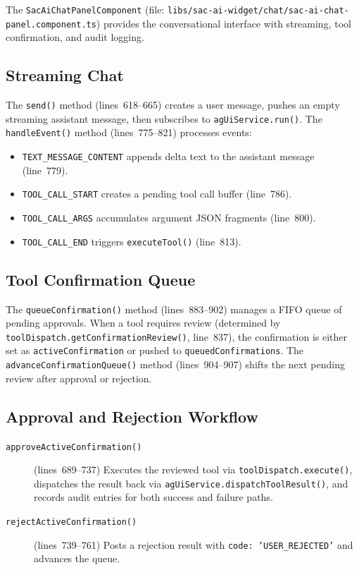 \documentclass[11pt]{article}
\begin{document}
The \texttt{SacAiChatPanelComponent} (file:
\texttt{libs/sac-ai-widget/chat/sac-ai-chat-panel.component.ts}) provides the
conversational interface with streaming, tool confirmation, and audit logging.

\subsection{Streaming Chat}

The \texttt{send()} method (lines~618--665) creates a user message, pushes an
empty streaming assistant message, then subscribes to \texttt{agUiService.run()}.
The \texttt{handleEvent()} method (lines~775--821) processes events:

\begin{itemize}
  \item \texttt{TEXT\_MESSAGE\_CONTENT} appends delta text to the assistant
    message (line~779).
  \item \texttt{TOOL\_CALL\_START} creates a pending tool call buffer
    (line~786).
  \item \texttt{TOOL\_CALL\_ARGS} accumulates argument JSON fragments
    (line~800).
  \item \texttt{TOOL\_CALL\_END} triggers \texttt{executeTool()} (line~813).
\end{itemize}

\subsection{Tool Confirmation Queue}

The \texttt{queueConfirmation()} method (lines~883--902) manages a FIFO queue
of pending approvals. When a tool requires review (determined by
\texttt{toolDispatch.getConfirmationReview()}, line~837), the confirmation is
either set as \texttt{activeConfirmation} or pushed to
\texttt{queuedConfirmations}. The \texttt{advanceConfirmationQueue()} method
(lines~904--907) shifts the next pending review after approval or rejection.

\subsection{Approval and Rejection Workflow}

\begin{description}
  \item[\texttt{approveActiveConfirmation()}] (lines~689--737) Executes the
    reviewed tool via \texttt{toolDispatch.execute()}, dispatches the result
    back via \texttt{agUiService.dispatchToolResult()}, and records audit
    entries for both success and failure paths.
  \item[\texttt{rejectActiveConfirmation()}] (lines~739--761) Posts a rejection
    result with \texttt{code: 'USER\_REJECTED'} and advances the queue.
\end{description}
\end{document}
